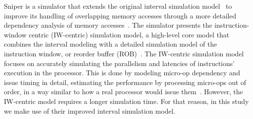 \documentclass[AMA,final,STIX1COL]{WileyNJD-v2}
\newcommand{\vsg}[1]{\textcolor{blue}{\bfseries \ul{vsgirelli: #1} }\vspace{0.2cm}}
\newcommand{\fbm}[1]{\textcolor{red}{\bfseries \ul{fbm: #1} }\vspace{0.2cm}}
\begin{document}
Sniper is a simulator that extends the original interval simulation model~\cite{genbrugge2010interval} to improve its handling of overlapping memory accesses through a more detailed dependency analysis of memory accesses~\cite{carlson2014aeohmcm}.
The simulator presents the instruction-window centric (IW-centric) simulation model, a high-level core model that combines the interval modeling with a detailed simulation model of the instruction window, or reorder buffer (ROB)~\cite{carlson2014aeohmcm}.
The IW-centric simulation model focuses on accurately simulating the parallelism and latencies of instructions' execution in the processor. 
This is done by modeling micro-op dependency and issue timing in detail, estimating the performance by processing micro-ops out of order, in a way similar to how a real processor would issue them~\cite{carlson2014aeohmcm}.
However, the IW-centric model requires a longer simulation time.
For that reason, in this study we make use of their improved interval simulation model.

\end{document}
